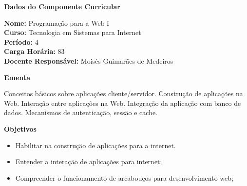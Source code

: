 

\begin{snugshade}\begin{center}\textbf{
    Dados do Componente Curricular
}\end{center}\end{snugshade}

\noindent \textbf{Nome:}                Programação para a Web I
\\        \textbf{Curso:}               Tecnologia em Sistemas para Internet
\\        \textbf{Período:}             \unit{4}{\degree}
\\        \textbf{Carga Horária:}       \unit{83}{\hour}
\\        \textbf{Docente Responsável:} Moisés Guimarães de Medeiros


\begin{snugshade}\begin{center}\textbf{
    Ementa
\vphantom{q}}\end{center}\end{snugshade}

\noindent
Conceitos básicos sobre aplicações cliente/servidor. Construção de aplicações na Web. Interação entre aplicações na Web. Integração da aplicação com banco de dados. Mecanismos de autenticação, sessão e cache. 

\begin{snugshade}\begin{center}\textbf{
    Objetivos
}\end{center}\end{snugshade}

\begin{itemize}

\item Habilitar na construção de aplicações para a internet.

\item Entender a interação de aplicações para internet;

\item Compreender o funcionamento de arcabouços para desenvolvimento web;

\end{itemize} 



